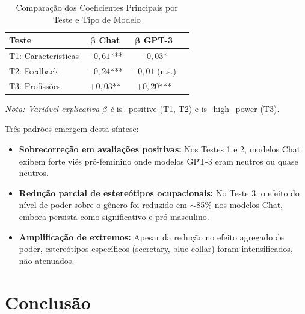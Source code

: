 \documentclass[12pt,a4paper]{article}
\begin{document}
\begin{table}[H]
\centering
\caption{Comparação dos Coeficientes Principais por Teste e Tipo de Modelo}
\label{tab:sintese}
\begin{tabular}{lccc}
\toprule
\textbf{Teste} & $\boldsymbol{\beta}$ \textbf{Chat} & $\boldsymbol{\beta}$ %
\textbf{GPT-3} \\
\midrule
T1: Características & $-0,61$*** & $-0,03$*  \\
T2: Feedback & $-0,24$*** & $-0,01$ (n.s.)  \\
T3: Profissões & $+0,03$** & $+0,20$***  \\
\bottomrule
\end{tabular}
\end{table}

\textit{Nota: Variável explicativa} $\beta$ \textit{é} is\_positive (T1, T2) e is\_high\_power
(T3).

Três padrões emergem desta síntese:

\begin{itemize}
\item \textbf{Sobrecorreção em avaliações positivas:} Nos Testes 1 e 2, modelos Chat exibem forte viés pró-feminino onde modelos GPT-3 eram neutros ou quase neutros.

\item \textbf{Redução parcial de estereótipos ocupacionais:} No Teste 3, o efeito do nível de poder sobre o gênero foi reduzido em $\sim$85\% nos modelos Chat, embora persista como significativo e pró-masculino.

\item \textbf{Amplificação de extremos:} Apesar da redução no efeito agregado de poder, estereótipos específicos (secretary, blue collar) foram intensificados, não atenuados.
\end{itemize}




\section{Conclusão}
\end{document}
